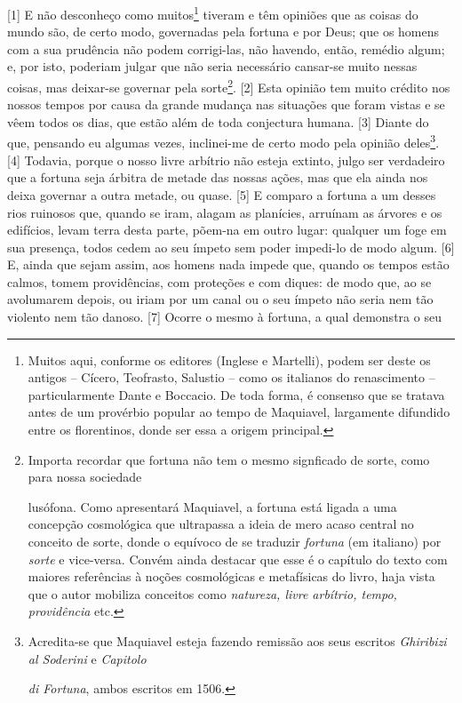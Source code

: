{[}1{]} E não desconheço como muitos\footnote{Muitos aqui, conforme os
  editores (Inglese e Martelli), podem ser deste os antigos -- Cícero,
  Teofrasto, Salustio -- como os italianos do renascimento --
  particularmente Dante e Boccacio. De toda forma, é consenso que se
  tratava antes de um provérbio popular ao tempo de Maquiavel,
  largamente difundido entre os florentinos, donde ser essa a origem
  principal.} tiveram e têm opiniões que as coisas do mundo são, de
certo modo, governadas pela fortuna e por Deus; que os homens com a sua
prudência não podem corrigi-las, não havendo, então, remédio algum; e,
por isto, poderiam julgar que não seria necessário cansar-se muito
nessas coisas, mas deixar-se governar pela sorte\footnote{Importa
  recordar que fortuna não tem o mesmo signficado de sorte, como para
  nossa sociedade

  lusófona. Como apresentará Maquiavel, a fortuna está ligada a uma
  concepção cosmológica que ultrapassa a ideia de mero acaso central no
  conceito de sorte, donde o equívoco de se traduzir \emph{fortuna} (em
  italiano) por \emph{sorte} e vice-versa. Convém ainda destacar que
  esse é o capítulo do texto com maiores referências à noções
  cosmológicas e metafísicas do livro, haja vista que o autor mobiliza
  conceitos como \emph{natureza, livre arbítrio, tempo, providência}
  etc.}. {[}2{]} Esta opinião tem muito crédito nos nossos tempos por
causa da grande mudança nas situações que foram vistas e se vêem todos
os dias, que estão além de toda conjectura humana. {[}3{]} Diante do
que, pensando eu algumas vezes, inclinei-me de certo modo pela opinião
deles\footnote{Acredita-se que Maquiavel esteja fazendo remissão aos
  seus escritos \emph{Ghiribizi al Soderini} e \emph{Capitolo}

  \emph{di Fortuna}, ambos escritos em 1506.}. {[}4{]} Todavia, porque o
nosso livre arbítrio não esteja extinto, julgo ser verdadeiro que a
fortuna seja árbitra de metade das nossas ações, mas que ela ainda nos
deixa governar a outra metade, ou quase. {[}5{]} E comparo a fortuna a
um desses rios ruinosos que, quando se iram, alagam as planícies,
arruínam as árvores e os edifícios, levam terra desta parte, põem-na em
outro lugar: qualquer um foge em sua presença, todos cedem ao seu ímpeto
sem poder impedi-lo de modo algum. {[}6{]} E, ainda que sejam assim, aos
homens nada impede que, quando os tempos estão calmos, tomem
providências, com proteções e com diques: de modo que, ao se avolumarem
depois, ou iriam por um canal ou o seu ímpeto não seria nem tão violento
nem tão danoso. {[}7{]} Ocorre o mesmo à fortuna, a qual demonstra o seu

